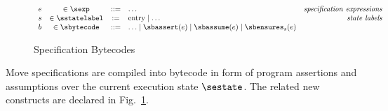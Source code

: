 
\begin{figure}[t!]
  \[
    \begin{array}{lcclr}
      e & \in \sexp & ::= & \ldots & \mathit{specification~expressions} \\
      s & \in \sstatelabel & := & \mathrm{entry} \mid \ldots  & \mathit{state~labels} \\
      b & \in \sbytecode & ::= & \ldots \mid
                                 \sbassert(e) \mid \sbassume(e) \mid \sbensures_s(e)

    \end{array}
  \]
  \caption{Specification Bytecodes}
  \label{fig:SpecCodes}
\end{figure}

Move specifications are compiled into bytecode in form of program assertions and
assumptions over the current execution state $\sestate$. The related new
constructs are declared in Fig.~\ref{fig:SpecCodes}.
